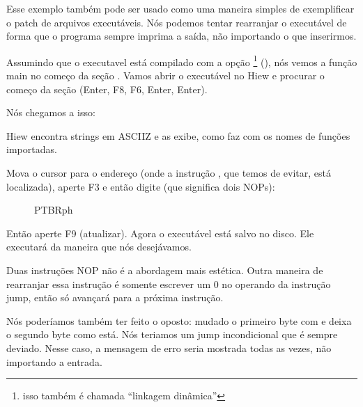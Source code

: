 
\PTBRph{}


\clearpage
{}

Esse exemplo também pode ser usado como uma maneira simples de exemplificar o patch de arquivos executáveis.
Nós podemos tentar rearranjar o executável de forma que o programa sempre imprima a saída, não importando o que inserirmos.

Assumindo que o executavel está compilado com a opção \footnote{isso também é chamada ``linkagem dinâmica''}
(), nós vemos a função main no começo da seção .
Vamos abrir o executável no Hiew e procurar o começo da seção  (Enter, F8, F6, Enter, Enter).

Nós chegamos a isso:

\begin{figure}[H]
\centering
{}
\caption{\PTBRph{}}
\label{fig:scanf_ex3_hiew_1}
\end{figure}

Hiew encontra strings em \ac{ASCIIZ} e as exibe, como faz com os nomes de funções importadas.

\clearpage
Mova o cursor para o endereço  (onde a instrução , que temos de evitar, está localizada), aperte F3 e então digite  (que significa dois \ac{NOP}s):

\begin{figure}[H]
\centering
{}
\caption{PTBRph{}}
\label{fig:scanf_ex3_hiew_2}
\end{figure}

Então aperte F9 (atualizar). Agora o executável está salvo no disco. Ele executará da maneira que nós desejávamos.

Duas instruções \ac{NOP} não é a abordagem mais estética.
Outra maneira de rearranjar essa instrução é somente escrever um 0 no operando da instrução jump,
então  só avançará para a próxima instrução.

Nós poderíamos também ter feito o oposto: mudado o primeiro byte com  e deixa o segundo byte como está.
Nós teriamos um jump incondicional que é sempre deviado.
Nesse caso, a mensagem de erro seria mostrada todas as vezes, não importando a entrada.

